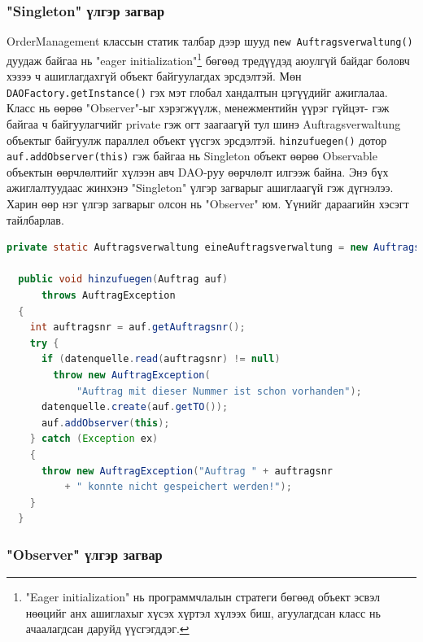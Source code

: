 \subsubsection{"Singleton" үлгэр загвар}
OrderManagement классын статик талбар дээр шууд \verb|new Auftragsverwaltung()| дуудаж байгаа нь "eager initialization"\footnote{"Eager initialization" нь программчлалын стратеги бөгөөд объект эсвэл нөөцийг анх ашиглахыг хүсэх хүртэл хүлээх биш, агуулагдсан класс нь ачаалагдсан даруйд үүсгэгддэг.} бөгөөд тредүүдэд аюулгүй байдаг боловч хэзээ ч ашиглагдахгүй объект байгуулагдах эрсдэлтэй. Мөн \verb|DAOFactory.getInstance()| гэх мэт глобал хандалтын цэгүүдийг ажиглалаа.   Класс нь өөрөө "Observer"-ыг хэрэгжүүлж, менежментийн үүрэг гүйцэт- гэж байгаа ч байгуулагчийг private гэж огт заагаагүй тул шинэ Auftragsverwaltung объектыг байгуулж параллел объект үүсгэх эрсдэлтэй. \verb|hinzufuegen()| дотор \verb|auf.addObserver(this)| гэж байгаа нь Singleton объект өөрөө Observable объектын өөрчлөлтийг хүлээн авч DAO-руу өөрчлөлт илгээж байна. Энэ бүх ажиглалтуудаас жинхэнэ "Singleton" үлгэр загварыг ашиглаагүй гэж дүгнэлээ. Харин өөр нэг үлгэр загварыг олсон нь "Observer" юм. Үүнийг дараагийн хэсэгт тайлбарлав.
\begin{lstlisting}[language=Java, caption=OrderManagement классын арга hinzufuegen, frame=single]
  private static Auftragsverwaltung eineAuftragsverwaltung = new Auftragsverwaltung();

  public void hinzufuegen(Auftrag auf)
      throws AuftragException
  {
    int auftragsnr = auf.getAuftragsnr();
    try {
      if (datenquelle.read(auftragsnr) != null)
        throw new AuftragException(
            "Auftrag mit dieser Nummer ist schon vorhanden");
      datenquelle.create(auf.getTO());
      auf.addObserver(this);
    } catch (Exception ex)
    {
      throw new AuftragException("Auftrag " + auftragsnr
          + " konnte nicht gespeichert werden!");
    }
  }
\end{lstlisting}

\subsubsection{"Observer" үлгэр загвар}

